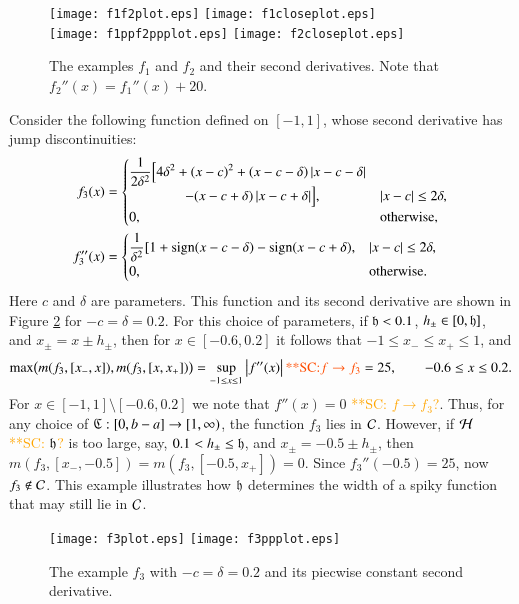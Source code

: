 \documentclass[review]{elsarticle}
\theoremstyle{definition}
\newcommand{\scnote}[1]{ {\textcolor{orange}  {\mbox{**SC:} #1}}}
\begin{document}
\begin{figure}[t]
\centering
\texttt{[image: f1f2plot.eps]} \qquad
\texttt{[image: f1closeplot.eps]} \\
\texttt{[image: f1ppf2ppplot.eps]} \qquad
\texttt{[image: f2closeplot.eps]}
\caption{The examples $f_1$ and $f_2$ and their second derivatives. Note that
$f_2''(x) = f_1''(x) + 20$.}
\label{f1f2fig}
\end{figure}

Consider the following function defined on $[-1,1]$, whose second derivative has jump discontinuities:
\begin{align*}
f_3(x) & = \begin{cases} \displaystyle
   \frac{1}{2\delta^2} \Bigl [4 \delta^2 + (x-c)^2 + (x-c-\delta)\left \lvert x-c-\delta \right \rvert
\\ \qquad \qquad
    - (x-c+\delta)\left \lvert x-c+\delta \right \rvert \Bigr ], & \left \lvert x-c \right \rvert \le 2\delta,
\\ 0, & \text{otherwise},
\end{cases} \\
f''_3(x) & =
\begin{cases} \displaystyle
    \frac{1}{\delta^2} [1 + \operatorname{sign}(x-c-\delta) - \operatorname{sign}(x-c+\delta), & \left \lvert x-c \right \rvert \le 2\delta,
\\ 0, & \text{otherwise}.
\end{cases}
\end{align*}
Here $c$ and $\delta$ are parameters. This function and its second derivative
are shown in Figure \ref{f3fig} for $-c=\delta = 0.2$. For this choice of
parameters, if $\mathfrak{h} < 0.1$, $h_\pm \in [0,\mathfrak{h}]$, and $x_\pm = x\pm h_\pm$, then
for $x \in [-0.6, 0.2]$ it follows that $-1 \le x_- \le x_+ \le 1$, and
\[
\max\bigl(m(f_3,[x_-,x]),m(f_3,[x,x_+])\bigr) = \sup_{-1 \le x \le 1} \abs{f''(x)} \scnote{f \rightarrow f_3} = 25, \qquad -0.6 \le x \le 0.2.
\]
For $x \in [-1,1] \setminus [-0.6, 0.2]$ we note that $f''(x) = 0$\scnote{$f \rightarrow f_3$?}. Thus, for
any choice of $\mathfrak{C} : [0,b-a] \to [1,\infty)$, the function $f_3$ lies in $\mathcal{C}$.
However, if $\mathcal{H}$ \scnote{$\mathfrak{h}$?}  is too large, say, $0.1 < h_\pm \le \mathfrak{h}$, and $x_\pm = -0.5\pm
h_\pm$, then $m(f_3,[x_-,-0.5])=m(f_3,[-0.5,x_+])=0$. Since $f_3''(-0.5) = 25$,
now $f_3 \notin \mathcal{C}$. This example illustrates how $\mathfrak{h}$ determines the width of
a spiky function that may still lie in $\mathcal{C}$.

\begin{figure}[t]
\centering
\texttt{[image: f3plot.eps]} \qquad
\texttt{[image: f3ppplot.eps]}
\caption{The example $f_3$ with $-c=\delta = 0.2$  and its piecwise constant second derivative.}
\label{f3fig}
\end{figure}
\end{document}
